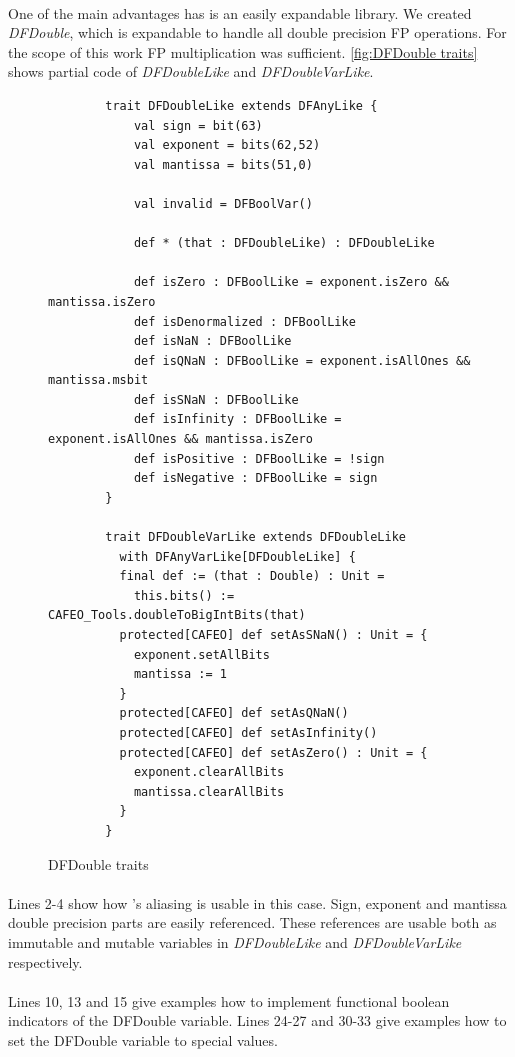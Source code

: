 \paragraph{}One of the main advantages \cf has is an easily expandable library. We created \textit{DFDouble}, which is expandable to handle all double precision FP operations. For the scope of this work FP multiplication was sufficient. \autoref{fig:DFDouble traits} shows partial code of \textit{DFDoubleLike} and \textit{DFDoubleVarLike}.
\begin{figure}[h]
	\centering
	\begin{verbatim}
		trait DFDoubleLike extends DFAnyLike {
			val sign = bit(63)
			val exponent = bits(62,52)
			val mantissa = bits(51,0)
			
			val invalid = DFBoolVar()
			
			def * (that : DFDoubleLike) : DFDoubleLike
			
			def isZero : DFBoolLike = exponent.isZero && mantissa.isZero
			def isDenormalized : DFBoolLike
			def isNaN : DFBoolLike
			def isQNaN : DFBoolLike = exponent.isAllOnes && mantissa.msbit
			def isSNaN : DFBoolLike
			def isInfinity : DFBoolLike = exponent.isAllOnes && mantissa.isZero
			def isPositive : DFBoolLike = !sign
			def isNegative : DFBoolLike = sign
		}

		trait DFDoubleVarLike extends DFDoubleLike 
		  with DFAnyVarLike[DFDoubleLike] {
		  final def := (that : Double) : Unit = 
		  	this.bits() := CAFEO_Tools.doubleToBigIntBits(that)
		  protected[CAFEO] def setAsSNaN() : Unit = {
		    exponent.setAllBits
		    mantissa := 1
		  }
		  protected[CAFEO] def setAsQNaN()
		  protected[CAFEO] def setAsInfinity()
		  protected[CAFEO] def setAsZero() : Unit = {
		    exponent.clearAllBits
		    mantissa.clearAllBits
		  }
		}
	\end{verbatim}
	\caption{DFDouble traits}\label{fig:DFDouble traits}
\end{figure}
\paragraph{}Lines 2-4 show how \cfns's aliasing is usable in this case. Sign, exponent and mantissa double precision parts are easily referenced. These references are usable both as immutable and mutable variables in \textit{DFDoubleLike} and \textit{DFDoubleVarLike} respectively.

\paragraph{}Lines 10, 13 and 15 give examples how to implement functional boolean indicators of the DFDouble variable. Lines 24-27 and 30-33 give examples how to set the DFDouble variable to special values.

